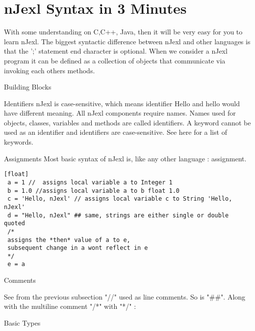 \chapter{nJexl Syntax in 3 Minutes}\label{intro-njexl}

{\LARGE W}ith some understanding on C,C++, Java, then it will be very easy for you to learn nJexl. The biggest syntactic difference between nJexl and other languages is that the ';' statement end character is optional. When we consider a nJexl program it can be defined as a collection of objects that communicate via invoking each others methods. 


\begin{section}{Building Blocks}

\begin{subsection}{Identifiers}
nJexl is case-sensitive, which means identifier Hello and hello would have different meaning.
All nJexl components require names. Names used for objects, classes, variables and methods are called identifiers. 
A keyword cannot be used as an identifier and identifiers are case-sensitive. 
See here for a list of keywords. 

\end{subsection}


\begin{subsection}{Assignments}
Most basic syntax of nJexl is, like any other language : assignment.
\begin{lstlisting}[style=JexlStyle][float]
 a = 1 //  assigns local variable a to Integer 1
 b = 1.0 //assigns local variable a to b float 1.0
 c = 'Hello, nJexl' // assigns local variable c to String 'Hello, nJexl'
 d = "Hello, nJexl" ## same, strings are either single or double quoted 
 /* 
 assigns the *then* value of a to e, 
 subsequent change in a wont reflect in e 
 */
 e = a \end{lstlisting}

\end{subsection}

\begin{subsection}{Comments}

See from the previous subsection "//" used as line comments. So is "\#\#".
Along with the multiline comment "/*" with  "*/" :

\end{subsection}


\begin{subsection}{Basic Types}


\end{subsection}
\end{section}
